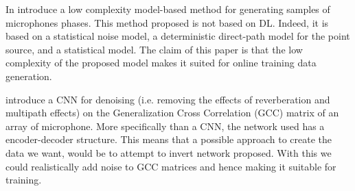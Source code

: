 \documentclass{article}
\begin{document}
In \cite{hubner2021efficient} introduce a low complexity model-based method for generating samples of microphones phases. This method proposed is not based on DL. Indeed, it is based on a statistical noise model, a deterministic direct-path model for the point source, and a statistical model. The claim of this paper is that the low complexity of the proposed  model makes it suited for online training data generation. 

\cite{vera2021acoustic} introduce a CNN for denoising (i.e. removing the effects of reverberation and multipath effects) on the Generalization Cross Correlation (GCC) matrix of an array of microphone. More specifically than a CNN, the network used has a encoder-decoder structure. This means that a possible approach to create the data we want, would be to attempt to invert network proposed. With this we could realistically add noise to GCC matrices and hence making it suitable for training.


%

 
\end{document}
